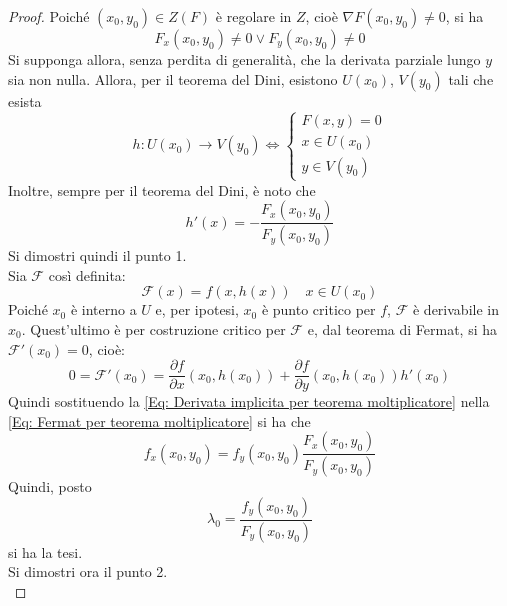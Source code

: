 \begin{proof}
    Poiché $(x_0, y_0) \in Z(F)$ è regolare in $Z$, cioè $\nabla F(x_0, y_0) \neq 0$, si ha 
    \begin{equation}
        F_x(x_0, y_0) \neq 0 \lor F_y(x_0, y_0) \neq 0
    \end{equation}
    Si supponga allora, senza perdita di generalità, che la derivata parziale lungo $y$ sia non nulla. Allora, per il teorema del Dini, esistono $U(x_0)$, $V(y_0)$ tali che esista
    \begin{equation}
    h:U(x_0) \to V(y_0) \iff \begin{cases}
        F(x, y)=0\\
        x\in U(x_0)\\
        y \in V(y_0)
    \end{cases}
    \end{equation}
    Inoltre, sempre per il teorema del Dini, è noto che
    \begin{equation} \label{Eq: Derivata implicita per teorema moltiplicatore}
        h'(x)=- \frac{F_x(x_0, y_0)}{F_y(x_0, y_0)} 
    \end{equation}
    Si dimostri quindi il punto 1.\\
    Sia $\mathcal{F}$ così definita:
    \begin{equation}
        \mathcal{F}(x)=f(x, h(x)) \quad x \in U(x_0)
    \end{equation}
    Poiché $x_0$ è interno a $U$ e, per ipotesi, $x_0$ è punto critico per $f$, $\mathcal{F}$ è derivabile in $x_0$. Quest'ultimo è per costruzione critico per $\mathcal{F}$ e, dal teorema di Fermat, si ha $\mathcal{F}'(x_0)=0$, cioè:
    \begin{equation}  \label{Eq: Fermat per teorema moltiplicatore}    0=\mathcal{F}'(x_0)=\frac{\partial{f}}{\partial{x}}(x_0, h(x_0))+ \frac{\partial{f}}{\partial{y}}(x_0, h(x_0))h'(x_0)
    \end{equation}
    Quindi sostituendo la \eqref{Eq: Derivata implicita per teorema moltiplicatore} nella \eqref{Eq: Fermat per teorema moltiplicatore} si ha che
    \begin{equation}
        f_x(x_0, y_0)={f_y(x_0, y_0)} \frac{F_x(x_0, y_0)}{F_y(x_0, y_0)}
    \end{equation}
    Quindi, posto
    \begin{equation}
        \lambda_0=\frac{f_y(x_0, y_0)}{F_y(x_0, y_0)}
    \end{equation}
    si ha la tesi.\\
    Si dimostri ora il punto 2.\\

\end{proof}
